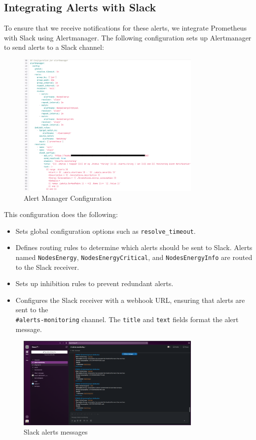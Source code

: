 \subsection{Integrating Alerts with Slack}

To ensure that we receive notifications for these alerts, we integrate Prometheus with Slack using Alertmanager. The following configuration sets up Alertmanager to send alerts to a Slack channel:

\begin{figure}[H]
    \centering
    \includegraphics[width=0.8\textwidth]{Figures/alert-manager.png}
    \caption{Alert Manager Configuration}
  \end{figure}

This configuration does the following:

\begin{itemize}
  \item Sets global configuration options such as \texttt{resolve\_timeout}.
  \item Defines routing rules to determine which alerts should be sent to Slack. Alerts named \texttt{NodesEnergy}, \texttt{NodesEnergyCritical}, and \texttt{NodesEnergyInfo} are routed to the Slack receiver.
  \item Sets up inhibition rules to prevent redundant alerts.
  \item Configures the Slack receiver with a webhook URL, ensuring that alerts are sent to the \\
  \texttt{\#alerts-monitoring} channel. The \texttt{title} and \texttt{text} fields format the alert message.
\end{itemize}

\begin{figure}[H]
  \centering
  \includegraphics[width=0.8\textwidth]{Figures/slack-green-it channel.png}
  \caption{Slack alerts messages}
\end{figure}

